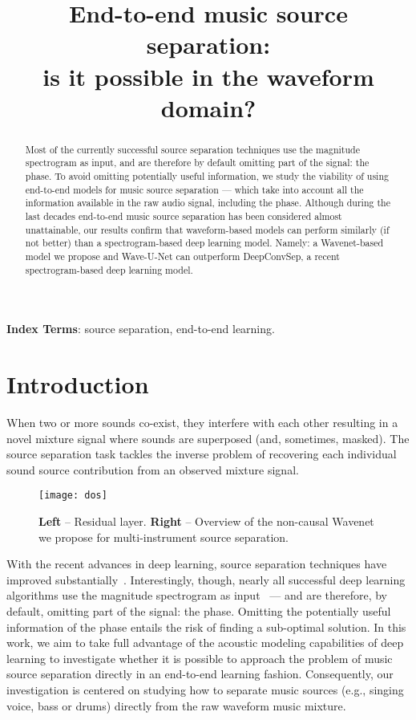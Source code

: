 \documentclass[a4paper]{article}
\title{End-to-end music source separation:\\is it possible in the waveform domain?}
\begin{document}
\maketitle
\begin{abstract}
Most of the currently successful source separation techniques use the magnitude spectrogram as input, and are therefore by default omitting part of the signal: the phase. To avoid omitting potentially useful information, we study the viability of using end-to-end models for music source separation --- which take into account all the information available in the raw audio signal, including the phase.
Although during the last decades end-to-end music source separation has been considered almost unattainable, our results confirm that waveform-based models can 
perform similarly (if not better) than
a spectrogram-based deep learning model. Namely: a Wavenet-based model we propose and Wave-U-Net can outperform DeepConvSep, a recent spectrogram-based deep learning model.  
\end{abstract}
\noindent\textbf{Index Terms}: source separation, end-to-end learning.


\section{Introduction}
\label{sec:intro}

When two or more sounds co-exist, they interfere with each other resulting in a novel mixture signal where sounds are superposed (and, sometimes, masked). The source separation task tackles the inverse problem of recovering each individual sound source contribution from an observed mixture signal. 

\begin{figure*}[!t]
	\centering
	\texttt{[image: dos]}
		\vspace{-6mm}
	\caption{\textbf{Left} -- Residual layer. \textbf{Right} -- Overview of the  non-causal Wavenet we propose for multi-instrument source separation.}
	\label{fig:dos}
	\vspace{-4mm}
\end{figure*}
With the recent advances in deep learning, source separation techniques have improved substantially~\cite{stoter20182018}. 
Interestingly, though, nearly all successful deep learning algorithms use the magnitude spectrogram as input~\cite{stoter20182018,chandna2017monoaural,jansson2017singing} --- and are therefore, by default, omitting part of the signal: the phase. 
Omitting the potentially useful information of the phase entails the risk of finding a sub-optimal solution. In this work, we aim to take full advantage of the acoustic modeling capabilities of deep learning to investigate whether it is possible to approach the problem of music source separation directly in an end-to-end learning fashion. 
Consequently, our investigation is centered on studying how to separate music sources (e.g., singing voice, bass or drums) directly from the raw waveform music mixture. 
\end{document}
